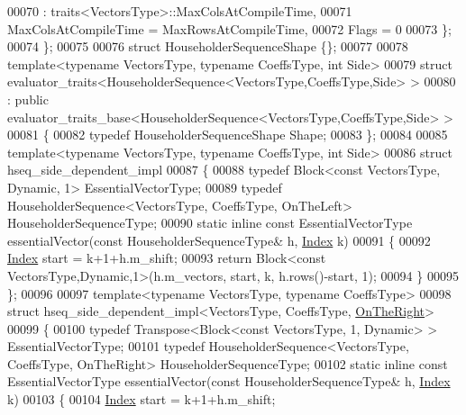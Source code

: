 \begin{DoxyCode}
00070                                            : traits<VectorsType>::MaxColsAtCompileTime,
00071     MaxColsAtCompileTime = MaxRowsAtCompileTime,
00072     Flags = 0
00073   \};
00074 \};
00075 
00076 \textcolor{keyword}{struct }HouseholderSequenceShape \{\};
00077 
00078 \textcolor{keyword}{template}<\textcolor{keyword}{typename} VectorsType, \textcolor{keyword}{typename} CoeffsType, \textcolor{keywordtype}{int} S\textcolor{keywordtype}{id}e>
00079 \textcolor{keyword}{struct }evaluator\_traits<HouseholderSequence<VectorsType,CoeffsType,Side> >
00080   : \textcolor{keyword}{public} evaluator\_traits\_base<HouseholderSequence<VectorsType,CoeffsType,Side> >
00081 \{
00082   \textcolor{keyword}{typedef} HouseholderSequenceShape Shape;
00083 \};
00084 
00085 \textcolor{keyword}{template}<\textcolor{keyword}{typename} VectorsType, \textcolor{keyword}{typename} CoeffsType, \textcolor{keywordtype}{int} S\textcolor{keywordtype}{id}e>
00086 \textcolor{keyword}{struct }hseq\_side\_dependent\_impl
00087 \{
00088   \textcolor{keyword}{typedef} Block<const VectorsType, Dynamic, 1> EssentialVectorType;
00089   \textcolor{keyword}{typedef} HouseholderSequence<VectorsType, CoeffsType, OnTheLeft> HouseholderSequenceType;
00090   \textcolor{keyword}{static} \textcolor{keyword}{inline} \textcolor{keyword}{const} EssentialVectorType essentialVector(\textcolor{keyword}{const} HouseholderSequenceType& h, 
      \hyperlink{namespace_eigen_a62e77e0933482dafde8fe197d9a2cfde}{Index} k)
00091   \{
00092     \hyperlink{namespace_eigen_a62e77e0933482dafde8fe197d9a2cfde}{Index} start = k+1+h.m\_shift;
00093     \textcolor{keywordflow}{return} Block<const VectorsType,Dynamic,1>(h.m\_vectors, start, k, h.rows()-start, 1);
00094   \}
00095 \};
00096 
00097 \textcolor{keyword}{template}<\textcolor{keyword}{typename} VectorsType, \textcolor{keyword}{typename} CoeffsType>
00098 \textcolor{keyword}{struct }hseq\_side\_dependent\_impl<VectorsType, CoeffsType, \hyperlink{group__enums_ggac22de43beeac7a78b384f99bed5cee0ba99dc75d8e00b6c3a5bdc31940f47492b}{OnTheRight}>
00099 \{
00100   \textcolor{keyword}{typedef} Transpose<Block<const VectorsType, 1, Dynamic> > EssentialVectorType;
00101   \textcolor{keyword}{typedef} HouseholderSequence<VectorsType, CoeffsType, OnTheRight> HouseholderSequenceType;
00102   \textcolor{keyword}{static} \textcolor{keyword}{inline} \textcolor{keyword}{const} EssentialVectorType essentialVector(\textcolor{keyword}{const} HouseholderSequenceType& h, 
      \hyperlink{namespace_eigen_a62e77e0933482dafde8fe197d9a2cfde}{Index} k)
00103   \{
00104     \hyperlink{namespace_eigen_a62e77e0933482dafde8fe197d9a2cfde}{Index} start = k+1+h.m\_shift;

\end{DoxyCode}
